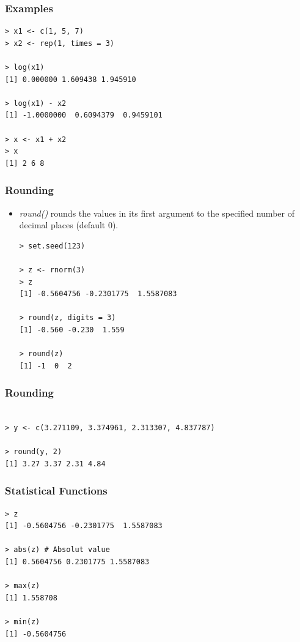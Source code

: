 \documentclass[xcolor=dvipsnames, xcolor=table]{beamer} %
\theoremstyle{mystyle}
\begin{document}
\begin{frame}[fragile]
\frametitle{Examples}

\begin{verbatim}
> x1 <- c(1, 5, 7)
> x2 <- rep(1, times = 3)

> log(x1)
[1] 0.000000 1.609438 1.945910

> log(x1) - x2
[1] -1.0000000  0.6094379  0.9459101

> x <- x1 + x2
> x
[1] 2 6 8
\end{verbatim}

\end{frame}

\begin{frame}[fragile]
\frametitle{Rounding}

\begin{itemize}
\item \textit{round()} rounds the values in its first argument to the specified number of decimal places (default 0).


\begin{verbatim}
> set.seed(123)

> z <- rnorm(3)
> z
[1] -0.5604756 -0.2301775  1.5587083

> round(z, digits = 3)
[1] -0.560 -0.230  1.559

> round(z)
[1] -1  0  2

\end{verbatim}

\end{itemize}

\end{frame}

\begin{frame}[fragile]
\frametitle{Rounding}

\begin{verbatim}

> y <- c(3.271109, 3.374961, 2.313307, 4.837787)

> round(y, 2)
[1] 3.27 3.37 2.31 4.84
\end{verbatim}

\end{frame}

\begin{frame}[fragile]
\frametitle {Statistical Functions}
\begin{verbatim}
> z
[1] -0.5604756 -0.2301775  1.5587083

> abs(z) # Absolut value
[1] 0.5604756 0.2301775 1.5587083

> max(z)
[1] 1.558708

> min(z)
[1] -0.5604756

\end{verbatim}

\end{frame}
\end{document}

